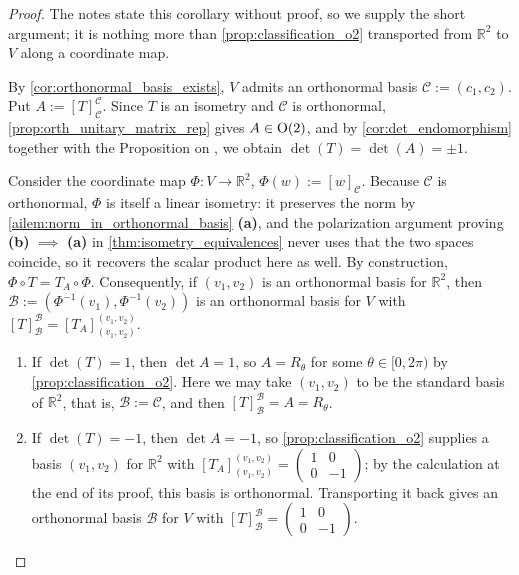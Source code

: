\begin{proof}
The notes state this corollary without proof, so we supply the short argument; it is nothing more than \cref{prop:classification_o2} transported from $\mathbb{R}^2$ to $V$ along a coordinate map.

By \cref{cor:orthonormal_basis_exists}, $V$ admits an orthonormal basis $\mathcal{C} := (c_1, c_2)$. Put $A := [T]_{\mathcal{C}}^{\mathcal{C}}$. Since $T$ is an isometry and $\mathcal{C}$ is orthonormal, \cref{prop:orth_unitary_matrix_rep} gives $A \in \operatorname{O}(2)$, and by \cref{cor:det_endomorphism} together with the Proposition on , we obtain $\det(T) = \det(A) = \pm 1$.

Consider the coordinate map $\Phi \colon V \to \mathbb{R}^2$, $\Phi(w) := [w]_{\mathcal{C}}$. Because $\mathcal{C}$ is orthonormal, $\Phi$ is itself a linear isometry: it preserves the norm by \cref{ailem:norm_in_orthonormal_basis} \textbf{(a)}, and the polarization argument proving \textbf{(b)} $\implies$ \textbf{(a)} in \cref{thm:isometry_equivalences} never uses that the two spaces coincide, so it recovers the scalar product here as well. By construction, $\Phi \circ T = T_A \circ \Phi$. Consequently, if $(v_1, v_2)$ is an orthonormal basis for $\mathbb{R}^2$, then $\mathcal{B} := (\Phi^{-1}(v_1), \Phi^{-1}(v_2))$ is an orthonormal basis for $V$ with $[T]_{\mathcal{B}}^{\mathcal{B}} = [T_A]_{(v_1, v_2)}^{(v_1, v_2)}$.

\begin{enumerate}[label=\textbf{(\alph*)}]
    \item If $\det(T) = 1$, then $\det A = 1$, so $A = R_\theta$ for some $\theta \in [0, 2\pi)$ by \cref{prop:classification_o2}. Here we may take $(v_1, v_2)$ to be the standard basis of $\mathbb{R}^2$, that is, $\mathcal{B} := \mathcal{C}$, and then $[T]_{\mathcal{B}}^{\mathcal{B}} = A = R_\theta$.
    \item If $\det(T) = -1$, then $\det A = -1$, so \cref{prop:classification_o2} supplies a basis $(v_1, v_2)$ for $\mathbb{R}^2$ with $[T_A]_{(v_1, v_2)}^{(v_1, v_2)} = \left(\begin{smallmatrix} 1 & 0 \\ 0 & -1 \end{smallmatrix}\right)$; by the calculation at the end of its proof, this basis is orthonormal. Transporting it back gives an orthonormal basis $\mathcal{B}$ for $V$ with $[T]_{\mathcal{B}}^{\mathcal{B}} = \left(\begin{smallmatrix} 1 & 0 \\ 0 & -1 \end{smallmatrix}\right)$.
\end{enumerate}
\end{proof}

